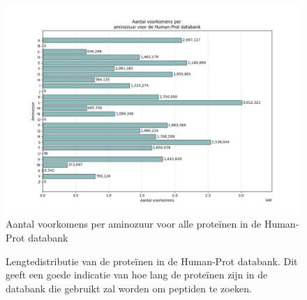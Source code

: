 \documentclass[11pt,dutch,faculty=we,layout=titlefont,underline=false,titleUppercase=true,titleUnderline=true]{ugent2016-report}
\begin{document}
    \begin{figure}[H]
        \centering
        \includegraphics[width=0.7\linewidth]{humanprot_aminozuur_voorkomens}
        \caption{Aantal voorkomens per aminozuur voor alle proteïnen in de Human-Prot databank}
        \label{fig:humanprot_aminozuur}
    \end{figure}

    \begin{figure}[H]
        \centering
        \hfill
        \caption{Lengtedistributie van de proteïnen in de Human-Prot databank. Dit geeft een goede indicatie van hoe lang de proteïnen zijn in de databank die gebruikt zal worden om peptiden te zoeken.}\label{fig:humanprot_length}
    \end{figure}
\end{document}
